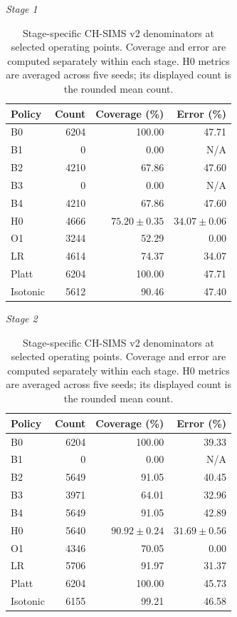 \begin{table}[!ht]
\centering
\caption{Stage-specific CH-SIMS v2 denominators at selected operating points. Coverage and error are computed separately within each stage. H0 metrics are averaged across five seeds; its displayed count is the rounded mean count.}
\label{tab:stage-specific}
\scriptsize
\textit{Stage 1}\\[2pt]
\begin{tabular}{lrrr}
\toprule
Policy & Count & Coverage (\%) & Error (\%) \\
\midrule
B0 & 6204 & 100.00 & 47.71 \\
B1 & 0 & 0.00 & N/A \\
B2 & 4210 & 67.86 & 47.60 \\
B3 & 0 & 0.00 & N/A \\
B4 & 4210 & 67.86 & 47.60 \\
H0 & 4666 & \(75.20\pm0.35\) & \(34.07\pm0.06\) \\
O1 & 3244 & 52.29 & 0.00 \\
LR & 4614 & 74.37 & 34.07 \\
Platt & 6204 & 100.00 & 47.71 \\
Isotonic & 5612 & 90.46 & 47.40 \\
\bottomrule
\end{tabular}

\vspace{5pt}
\textit{Stage 2}\\[2pt]
\begin{tabular}{lrrr}
\toprule
Policy & Count & Coverage (\%) & Error (\%) \\
\midrule
B0 & 6204 & 100.00 & 39.33 \\
B1 & 0 & 0.00 & N/A \\
B2 & 5649 & 91.05 & 40.45 \\
B3 & 3971 & 64.01 & 32.96 \\
B4 & 5649 & 91.05 & 42.89 \\
H0 & 5640 & \(90.92\pm0.24\) & \(31.69\pm0.56\) \\
O1 & 4346 & 70.05 & 0.00 \\
LR & 5706 & 91.97 & 31.37 \\
Platt & 6204 & 100.00 & 45.73 \\
Isotonic & 6155 & 99.21 & 46.58 \\
\bottomrule
\end{tabular}
\end{table}
